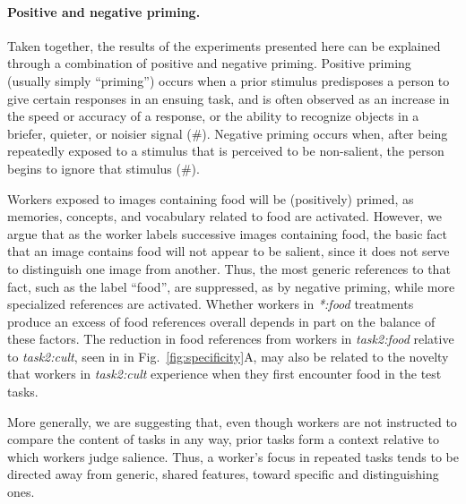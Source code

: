 \documentclass[12pt]{article}
\begin{document}
\paragraph{Positive and negative priming.}
Taken together, the results of the experiments presented here can be 
explained through a combination of positive and negative priming.
Positive priming (usually simply ``priming'') occurs when a prior stimulus 
predisposes a person to give certain responses in an ensuing task, and
is often observed as an increase in the speed or accuracy of a response, or
the ability to recognize objects in a briefer, quieter, or noisier signal (\#).
Negative priming occurs when, after being repeatedly exposed to a stimulus 
that is perceived to be non-salient, the person begins to ignore that 
stimulus (\#).  

Workers exposed to images containing food will be (positively) primed, 
as memories, concepts, and vocabulary related to food are activated.  
However, we argue that as the worker labels successive images containing food,
the basic 
fact that an image contains food will not appear to be salient, since it 
does not serve to distinguish one image from another.  Thus, the most 
generic references to that fact, such as the label ``food'', 
are suppressed, as by negative priming, while more specialized
references are activated.  Whether workers in \textit{*:food} treatments
produce an excess of food references overall depends in part on the balance 
of these factors.  The reduction in food references from workers in 
\textit{task2:food} relative to \textit{task2:cult}, seen in in 
Fig.~\ref{fig:specificity}A, may also be
related to the novelty that workers in 
\textit{task2:cult} experience when they first encounter food in the test 
tasks.

More generally, we are suggesting that, even though workers are not 
instructed to compare the content of tasks in any way, prior tasks form a 
context relative to which workers judge salience.  Thus, a worker's focus 
in repeated tasks tends to be directed away from generic, shared features, 
toward specific and distinguishing ones.
\end{document}
